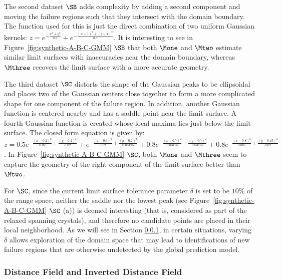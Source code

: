 The second dataset $\SB$ adds complexity by adding a second component and moving the failure regions such that they intersect with the domain boundary.
%
The function used for this is just the direct combination of two uniform Gaussian kernels:
$z = e^{-\frac{x^2+y^2}{0.3}} + e^{-\frac{(x-1)^2+(y-1)^2}{0.3}}$.
%
It is interesting to see in Figure~\ref{fig:synthetic-A-B-C-GMM} $\SB$ that both $\Mone$ and $\Mtwo$ estimate similar limit surfaces with inaccuracies near the domain boundary, whereas $\Mthree$ recovers the limit surface with a more accurate geometry.

The third dataset $\SC$ distorts the shape of the Gaussian peaks to be ellipsoidal and places two of the Gaussian centers close together to form a more complicated shape for one  component of the failure region.
%
In addition, another Gaussian function is centered nearby and has a saddle point near the limit surface.
%
A fourth Gaussian function is created whose local maxima lies just below the limit surface.
%
The closed form equation is given by:
$z = 0.5e^{-\frac{(x-0.2)^2}{0.02}+\frac{(y-0.2)^2}{0.02}}
   +    e^{-\frac{(x-0.3)^2}{0.02}+\frac{(y-0.7)^2}{0.03125}}
   + 0.8e^{-\frac{(x-0.7)^2}{0.03125}+\frac{(y-0.7)^2}{0.03125}}
   + 0.8e^{-\frac{(x-0.8)^2}{0.005}+\frac{(y-0.45)^2}{0.02}}$.
In Figure~\ref{fig:synthetic-A-B-C-GMM} $\SC$, both $\Mone$ and $\Mthree$ seem to capture the geometry of the right component of the limit surface better than $\Mtwo$.

For $\SC$, since the current limit surface tolerance parameter $\delta$ is set to be $10\%$ of the range space, neither the saddle nor the lowest peak (see Figure~\ref{fig:synthetic-A-B-C-GMM} $\SC$ (a)) is deemed interesting (that is, considered as part of the relaxed spanning crystals), and therefore no candidate points are placed in their local neighborhood.
%
As we will see in Section \ref{subsec:df}, in certain situations, varying $\delta$ allows exploration of the domain space that may lead to identifications of new failure regions that are otherwise undetected by the global prediction model.


\subsubsection{Distance Field and Inverted Distance Field}
\label{subsec:df}

